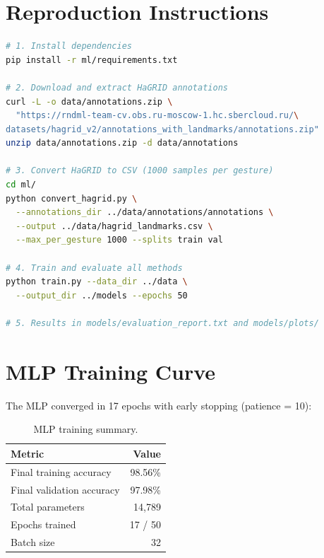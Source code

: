 \documentclass[11pt,a4paper]{article}
\begin{document}
\newpage
\appendix

\section{Reproduction Instructions}
\label{app:reproduction}

\begin{lstlisting}[language=bash]
# 1. Install dependencies
pip install -r ml/requirements.txt

# 2. Download and extract HaGRID annotations
curl -L -o data/annotations.zip \
  "https://rndml-team-cv.obs.ru-moscow-1.hc.sbercloud.ru/\
datasets/hagrid_v2/annotations_with_landmarks/annotations.zip"
unzip data/annotations.zip -d data/annotations

# 3. Convert HaGRID to CSV (1000 samples per gesture)
cd ml/
python convert_hagrid.py \
  --annotations_dir ../data/annotations/annotations \
  --output ../data/hagrid_landmarks.csv \
  --max_per_gesture 1000 --splits train val

# 4. Train and evaluate all methods
python train.py --data_dir ../data \
  --output_dir ../models --epochs 50

# 5. Results in models/evaluation_report.txt and models/plots/
\end{lstlisting}

\section{MLP Training Curve}
\label{app:training}

The MLP converged in 17 epochs with early stopping (patience = 10):

\begin{table}[H]
\centering
\caption{MLP training summary.}
\begin{tabular}{@{}lr@{}}
\toprule
\textbf{Metric} & \textbf{Value} \\
\midrule
Final training accuracy & 98.56\% \\
Final validation accuracy & 97.98\% \\
Total parameters & 14,789 \\
Epochs trained & 17 / 50 \\
Batch size & 32 \\
\bottomrule
\end{tabular}
\end{table}
\end{document}

